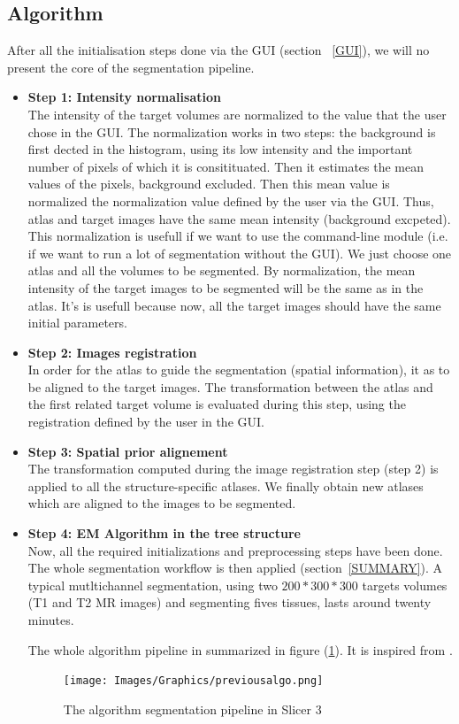 \subsection{Algorithm}
After all the initialisation steps done via the GUI (section ~\ref{GUI}), we will no present the core of the segmentation pipeline.
%
\begin{itemize}
\item \textbf{Step 1: Intensity normalisation}\\
\hspace*{4 mm}The intensity of the target volumes are normalized to the value that the user chose in the GUI. The normalization works in two steps: the background is first dected in the histogram, using its low intensity and the important number of pixels of which it is consitituated. Then it estimates the mean values of the pixels, background excluded. Then this mean value is normalized the normalization value defined by the user via the GUI. Thus, atlas and target images have the same mean intensity (background excpeted). This normalization is usefull if we want to use the command-line module (i.e. if we want to run a lot of segmentation without the GUI). We just choose one atlas and all the volumes to be segmented. By normalization, the mean intensity of the target images to be segmented will be the same as in the atlas. It's is usefull because now, all the target images should have the same initial parameters.
%
\item \textbf{Step 2: Images registration}\\
\hspace*{4 mm}In order for the atlas to guide the segmentation (spatial information), it as to be aligned to the target images. The transformation between the atlas and the first related target volume is evaluated during this step, using the registration defined by the user in the GUI.
%
\item \textbf{Step 3: Spatial prior alignement}\\
\hspace*{4 mm}The transformation computed during the image registration step (step 2) is applied to all the structure-specific atlases. We finally obtain new atlases which are aligned to the images to be segmented.
%
\item \textbf{Step 4: EM Algorithm in the tree structure}\\
\hspace*{4 mm}Now, all the required initializations and preprocessing steps have been done. The whole segmentation workflow is then applied (section~\ref{SUMMARY}). A typical mutltichannel segmentation, using two $200*300*300$ targets volumes (T1 and T2 MR images) and segmenting fives tissues, lasts around twenty minutes.
\par
The whole algorithm pipeline in summarized in figure (\ref{algopipe}). It is inspired from \cite{18}.

\begin{figure}[ht]\centering
  \texttt{[image: Images/Graphics/previousalgo.png]}
  \caption{The algorithm segmentation pipeline in Slicer 3}\label{algopipe}
  \end{figure}
  
\end{itemize}
%
